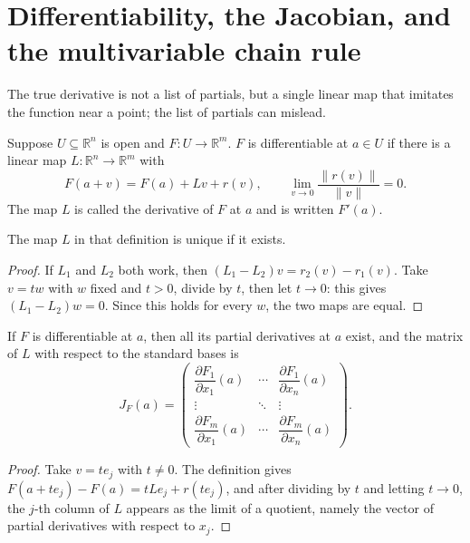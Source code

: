 \section{Differentiability, the Jacobian, and the multivariable chain rule}

The true derivative is not a list of partials, but a single linear map that imitates the
function near a point; the list of partials can mislead.

\begin{definisi}[Differentiability]
Suppose $U\subseteq\mathbb{R}^{n}$ is open and $F\colon U\to\mathbb{R}^{m}$. $F$ is
differentiable at $a\in U$ if there is a linear map $L\colon\mathbb{R}^{n}\to\mathbb{R}^{m}$
with
\[
  F(a+v)=F(a)+Lv+r(v),
  \qquad
  \lim_{v\to0}\frac{\|r(v)\|}{\|v\|}=0 .
\]
The map $L$ is called the derivative of $F$ at $a$ and is written $F'(a)$.
\end{definisi}

\begin{proposisi}
The map $L$ in that definition is unique if it exists.
\end{proposisi}

\begin{proof}
If $L_{1}$ and $L_{2}$ both work, then $(L_{1}-L_{2})v=r_{2}(v)-r_{1}(v)$. Take
$v=tw$ with $w$ fixed and $t>0$, divide by $t$, then let $t\to0$: this gives
$(L_{1}-L_{2})w=0$. Since this holds for every $w$, the two maps are equal.
\end{proof}

\begin{teorema}
If $F$ is differentiable at $a$, then all its partial derivatives at $a$ exist, and the matrix
of $L$ with respect to the standard bases is
\[
  J_{F}(a)=\begin{pmatrix}
    \dfrac{\partial F_{1}}{\partial x_{1}}(a) & \cdots &
    \dfrac{\partial F_{1}}{\partial x_{n}}(a)\\
    \vdots & \ddots & \vdots\\
    \dfrac{\partial F_{m}}{\partial x_{1}}(a) & \cdots &
    \dfrac{\partial F_{m}}{\partial x_{n}}(a)
  \end{pmatrix}.
\]
\end{teorema}

\begin{proof}
Take $v=te_{j}$ with $t\neq0$. The definition gives
$F(a+te_{j})-F(a)=tLe_{j}+r(te_{j})$, and after dividing by $t$ and letting $t\to0$, the $j$-th
column of $L$ appears as the limit of a quotient, namely the vector of partial derivatives
with respect to $x_{j}$.
\end{proof}

